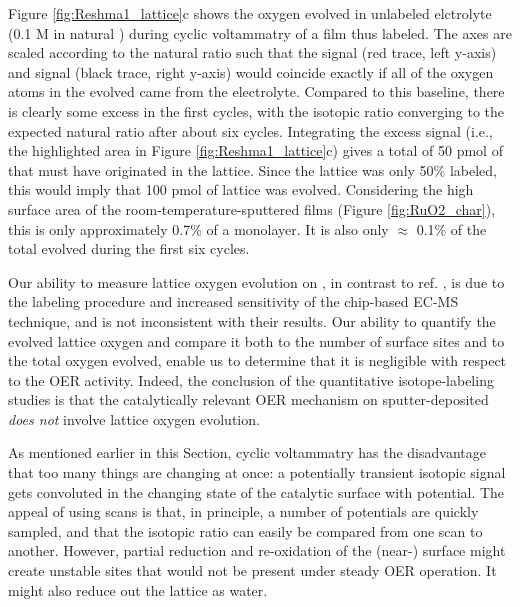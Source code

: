 Figure \ref{fig:Reshma1_lattice}c shows the oxygen evolved in unlabeled elctrolyte (0.1 M  in natural ) during cyclic voltammatry of a film thus labeled. The axes are scaled according to the natural ratio such that the  signal (red trace, left y-axis) and  signal (black trace, right y-axis) would coincide exactly if all of the oxygen atoms in the evolved  came from the electrolyte. Compared to this baseline, there is clearly some excess  in the first cycles, with the isotopic ratio converging to the expected natural ratio after about six cycles. Integrating the excess  signal (i.e., the highlighted area in Figure \ref{fig:Reshma1_lattice}c) gives a total of 50 pmol of  that must have originated in the lattice. Since the lattice was only 50\% labeled, this would imply that 100 pmol of lattice  was evolved. Considering the high surface area of the room-temperature-sputtered films (Figure \ref{fig:RuO2_char}), this is only approximately 0.7\% of a monolayer. It is also only $\approx$ 0.1\% of the total  evolved during the first six cycles. 

Our ability to measure lattice oxygen evolution on , in contrast to ref. \cite{Stoerzinger2017}, is due to the labeling procedure and increased sensitivity of the chip-based EC-MS technique, and is not inconsistent with their results. Our ability to quantify the evolved lattice oxygen and compare it both to the number of surface sites and to the total oxygen evolved, enable us to determine that it is negligible with respect to the OER activity. Indeed, the conclusion of the quantitative isotope-labeling studies is that the catalytically relevant OER mechanism on sputter-deposited  \textit{does not} involve lattice oxygen evolution.

As mentioned earlier in this Section, cyclic voltammatry has the disadvantage that too many things are changing at once: a potentially transient isotopic signal gets convoluted in the changing state of the catalytic surface with potential. The appeal of using scans is that, in principle, a number of potentials are quickly sampled\cite{Macounova2009}, and that the isotopic ratio can easily be compared from one scan to another\cite{Fierro2007}. However, partial reduction and re-oxidation of the (near-) surface might create unstable sites that would not be present under steady OER operation. It might also reduce out the lattice  as water. 

